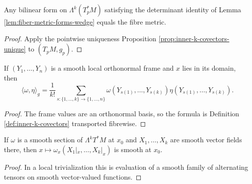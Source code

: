 \begin{lemma}
\label{lem:fiber-metric-forms-unique-pointwise}
\leanok
{}
Any bilinear form on $\Lambda^k(T_p^*M)$ satisfying the determinant identity of Lemma \ref{lem:fiber-metric-forms-wedge} equals the fibre metric.
\end{lemma}
\begin{proof}
\leanok
{}
\sketch Apply the pointwise uniqueness Proposition \ref{prop:inner-k-covectors-unique} to $(T_pM,g_p)$.
\end{proof}

\begin{lemma}
\label{lem:fiber-metric-forms-frame}
\leanok
{}
If $(Y_1,\ldots,Y_n)$ is a smooth local orthonormal frame and $x$ lies in its domain, then
\[
\langle\omega,\eta\rangle_g=\frac1{k!}\sum_{s:\{1,\ldots,k\}\to\{1,\ldots,n\}}\omega(Y_{s(1)},\ldots,Y_{s(k)})\eta(Y_{s(1)},\ldots,Y_{s(k)}).
\]
\end{lemma}
\begin{proof}
\leanok
{}
\sketch The frame values are an orthonormal basis, so the formula is Definition \ref{def:inner-k-covectors} transported fibrewise.
\end{proof}

\begin{lemma}
\label{lem:form-field-applied-to-vector-fields-smooth}
\leanok
If $\omega$ is a smooth section of $\Lambda^kT^*M$ at $x_0$ and $X_1,\ldots,X_k$ are smooth vector fields there, then $x\mapsto\omega_x(X_1|_x,\ldots,X_k|_x)$ is smooth at $x_0$.
\end{lemma}
\begin{proof}
\leanok
\sketch In a local trivialization this is evaluation of a smooth family of alternating tensors on smooth vector-valued functions.
\end{proof}

